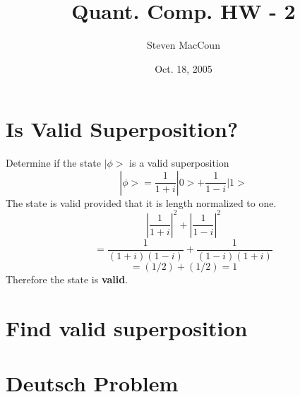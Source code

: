 \documentclass[12pt]{article}
\title{Quant. Comp. HW - 2}
\author{Steven MacCoun}
\date{Oct. 18, 2005}
\begin{document}
\maketitle						%



\section{Is Valid Superposition?}

Determine if the state $|\phi>$ is a valid superposition $$|\phi> = \frac{1}{1+i} |0> + \frac{1}{1-i}|1>$$
The state is valid provided that  it is length normalized to one.
$$|\frac{1}{1+i}|^2 + |\frac{1}{1-i}|^2$$ 
$$= \frac{1}{(1+i)(1-i)} + \frac{1}{(1-i)(1+i)}$$
$$= (1/2) + (1/2) = 1$$
Therefore the state is \textbf{valid}.

\section{Find valid superposition}
\section{}
\section{Deutsch Problem}
\end{document}
